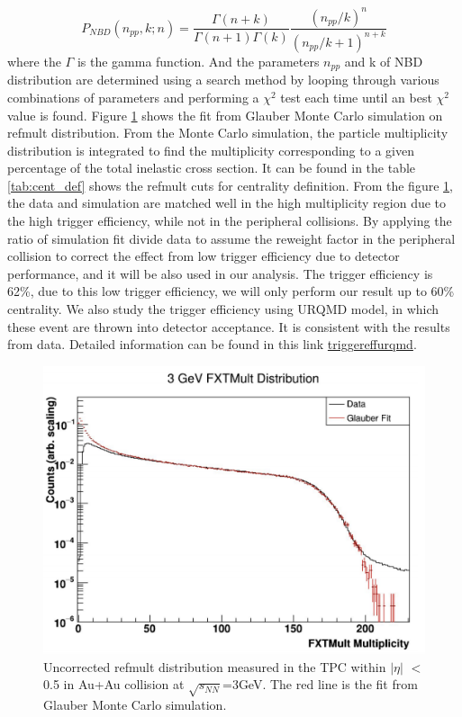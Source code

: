 \begin{equation}
    P_{NBD}(n_{pp},k;n) = \frac{\Gamma(n+k)}{\Gamma(n+1)\Gamma(k)} \frac{(n_{pp}/k)^{n}}{(n_{pp}/k+1)^{n+k}}
    \label{equ:NBD_dis}
\end{equation}
where the $\Gamma$ is the gamma function. And the parameters $n_{pp}$ and k of NBD distribution are determined using a search method by looping through various combinations of parameters and performing a $\chi^{2}$ test each time until an best $\chi^{2}$ value is found. Figure \ref{fig:glauber_fit} shows the fit from Glauber Monte Carlo simulation on refmult distribution. From the Monte Carlo simulation, the particle multiplicity distribution is integrated to find the multiplicity corresponding to a given percentage of the total inelastic cross section. It can be found in the table \ref{tab:cent_def} shows the refmult cuts for centrality definition. From the figure \ref{fig:glauber_fit}, the data and simulation are matched well in the high multiplicity region due to the high trigger efficiency, while not in the peripheral collisions. By applying the ratio of simulation fit divide data to assume the reweight factor in the peripheral collision to correct the effect from low trigger efficiency due to detector performance, and it will be also used in our analysis. The trigger efficiency is 62\%, due to this low trigger efficiency, we will only perform our result up to 60\% centrality.
We also study the trigger efficiency using URQMD model, in which these event are thrown into detector acceptance. It is consistent with the results from data. Detailed information can be found in this link \href{https://drupal.star.bnl.gov/STAR/system/files/CentralityFXT3GeVBulkCorrPWG.pdf}{triggereffurqmd}.

\begin{figure}
    \centering
    \includegraphics[scale=0.5]{FXT3gev/chapter1/fig/glauber_fit_ref.jpg}
    \caption{Uncorrected refmult distribution measured in the TPC within $|\eta|$ $<$ 0.5 in Au+Au collision at $\sqrt{s_{NN}}$=3GeV. The red line is the fit from Glauber Monte Carlo simulation.}
    \label{fig:glauber_fit}
\end{figure}

